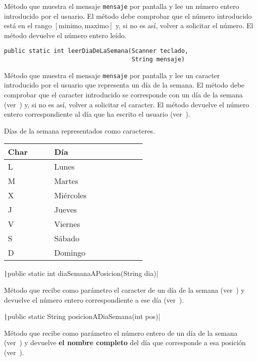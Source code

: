 \documentclass[
    a4paper, %
    12pt, %
]{CSSullivanBusinessReport}
\begin{document}
Método que muestra el mensaje \texttt{mensaje} por pantalla y lee un número entero introducido por el usuario. El método debe comprobar que el número introducido está en el rango \(\left [\mathrm{minimo},\mathrm{maximo}\right ]\) y, si no es así, volver a solicitar el número. El método devuelve el número entero leído.

\begin{verbatim}
public static int leerDiaDeLaSemana(Scanner teclado,
                                    String mensaje)
\end{verbatim}

Método que muestra el mensaje \texttt{mensaje} por pantalla y lee un caracter introducido por el usuario que representa un día de la semana. El método debe comprobar que el caracter introducido se corresponde con un día de la semana (ver~) y, si no es así, volver a solicitar el caracter. El método devuelve el número entero correspondiente al día que ha escrito el usuario (ver~).

\begin{margintable}
    \footnotesize
    \caption{Días de la semana representados como caracteres.}\label{tab:char-semana}
    \begin{tabular}{C{0.2\linewidth} L{0.4\linewidth}}
        \toprule
        \textbf{Char} & \textbf{Día}\\
        \midrule
        L & Lunes\\
        M & Martes\\
        X & Miércoles\\
        J & Jueves\\
        V & Viernes\\
        S & Sábado\\
        D & Domingo\\
        \bottomrule
    \end{tabular}
\end{margintable}

\texttt|public static int diaSemanaAPosicion(String dia)|

Método que recibe como parámetro el caracter de un día de la semana (ver~) y devuelve el número entero correspondiente a ese día (ver~).

\texttt|public static String posicionADiaSemana(int pos)|

Método que recibe como parámetro el número entero de un día de la semana (ver~) y devuelve \textbf{el nombre completo} del día que corresponde a esa posición (ver~).
\end{document}

